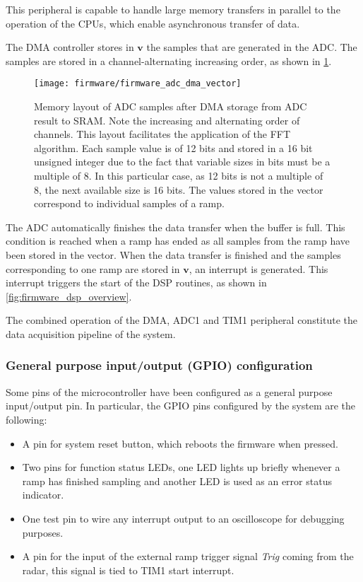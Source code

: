 This peripheral is capable to handle large memory transfers in parallel to the operation of the CPUs, which enable asynchronous transfer of data.

The DMA controller stores in $\mathbf{v}$ the samples that are generated in the ADC. The samples are stored in a channel-alternating increasing order, as shown in \cref{fig:firmware_adc_dma_vector}.

\begin{figure}[ht]
	\centering
	\texttt{[image: firmware/firmware\_adc\_dma\_vector]}
	\caption{Memory layout of ADC samples after DMA storage from ADC result to SRAM. Note the increasing and alternating order of channels. This layout facilitates the application of the FFT algorithm. Each sample value is of 12 bits and stored in a 16 bit unsigned integer due to the fact that variable sizes in bits must be a multiple of 8. In this particular case, as 12 bits is not a multiple of 8, the next available size is 16 bits. The values stored in the vector correspond to individual samples of a ramp.}
	\label{fig:firmware_adc_dma_vector}
\end{figure}

The ADC automatically finishes the data transfer when the buffer is full. This condition is reached when a ramp has ended as all samples from the ramp have been stored in the vector. When the data transfer is finished and the samples corresponding to one ramp are stored in $\mathbf{v}$, an interrupt is generated. This interrupt triggers the start of the DSP routines, as shown in \cref{fig:firmware_dsp_overview}.

The combined operation of the DMA, ADC1 and TIM1 peripheral constitute the data acquisition pipeline of the system.

\subsubsection{General purpose input/output (GPIO) configuration}

Some pins of the microcontroller have been configured as a general purpose input/output pin. In particular, the GPIO pins configured by the system are the following:
\begin{itemize}
	\item A pin for system reset button, which reboots the firmware when pressed.
	\item Two pins for function status LEDs, one LED lights up briefly whenever a ramp has finished sampling and another LED is used as an error status indicator.
	\item One test pin to wire any interrupt output to an oscilloscope for debugging purposes.
	\item A pin for the input of the external ramp trigger signal \textit{Trig} coming from the radar, this signal is tied to TIM1 start interrupt.
\end{itemize}

